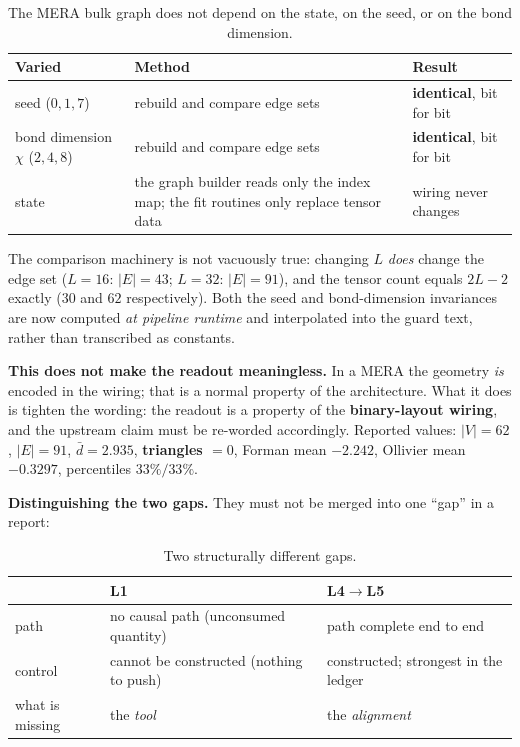 \documentclass[11pt,a4paper]{article}
\begin{document}
\begin{table}[h]
\centering\small
\begin{tabular}{@{}lll@{}}
\toprule
\textbf{Varied} & \textbf{Method} & \textbf{Result} \\
\midrule
seed ($0,1,7$)      & rebuild and compare edge sets & \textbf{identical}, bit for bit \\
bond dimension $\chi$ ($2,4,8$) & rebuild and compare edge sets & \textbf{identical}, bit for bit \\
state               & the graph builder reads only the index map;
                      the fit routines only replace tensor data & wiring never changes \\
\bottomrule
\end{tabular}
\caption{The MERA bulk graph does not depend on the state, on the seed, or on the
bond dimension.}
\label{tab:invariance}
\end{table}

\noindent The comparison machinery is not vacuously true: changing $L$ \emph{does}
change the edge set ($L{=}16$: $|E| = 43$; $L{=}32$: $|E| = 91$), and the tensor
count equals $2L-2$ exactly ($30$ and $62$ respectively). Both the seed and
bond-dimension invariances are now computed \emph{at pipeline runtime} and
interpolated into the guard text, rather than transcribed as constants.

\medskip
\noindent\textbf{This does not make the readout meaningless.} In a MERA the geometry
\emph{is} encoded in the wiring; that is a normal property of the architecture. What
it does is tighten the wording: the readout is a property of the
\textbf{binary-layout wiring}, and the upstream claim must be re-worded accordingly.
Reported values: $|V| = 62$, $|E| = 91$, $\bar d = 2.935$, \textbf{triangles $= 0$},
Forman mean $-2.242$, Ollivier mean $-0.3297$, percentiles $33\%/33\%$.

\medskip
\noindent\textbf{Distinguishing the two gaps.} They must not be merged into one
``gap'' in a report:

\begin{table}[h]
\centering\small
\begin{tabular}{@{}lll@{}}
\toprule
 & \textbf{L1} & \textbf{L4$\to$L5} \\
\midrule
path      & no causal path (unconsumed quantity) & path complete end to end \\
control   & cannot be constructed (nothing to push) & constructed; strongest in the ledger \\
what is missing & the \emph{tool} & the \emph{alignment} \\
\bottomrule
\end{tabular}
\caption{Two structurally different gaps.}
\label{tab:gaps}
\end{table}
\end{document}
